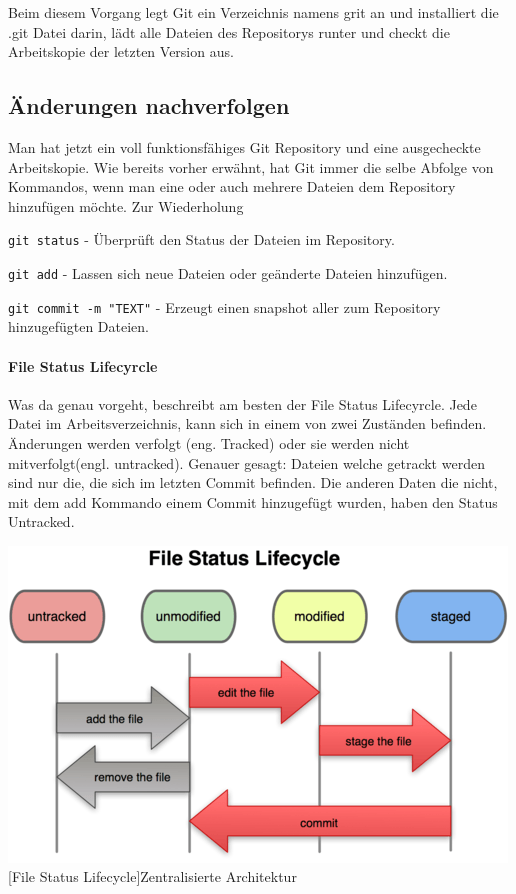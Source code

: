\documentclass[12pt,a4paper,bibliography=totocnumbered,listof=totocnumbered]{scrartcl}
\begin{document}
Beim diesem Vorgang legt Git ein Verzeichnis namens grit an und installiert die .git Datei darin, lädt alle Dateien des Repositorys runter und checkt die Arbeitskopie der letzten Version aus.




\subsection{Änderungen nachverfolgen}
Man hat jetzt ein voll funktionsfähiges Git Repository und eine ausgecheckte Arbeitskopie.  Wie bereits vorher erwähnt, hat Git immer die selbe Abfolge von Kommandos, wenn man eine oder auch mehrere Dateien dem Repository hinzufügen möchte. Zur Wiederholung

\begin{compactitem}
	\item \lstinline|git status| - Überprüft den Status der Dateien im Repository.
	\item \lstinline|git add| - Lassen sich neue Dateien oder geänderte Dateien hinzufügen. 
	\item \lstinline|git commit -m "TEXT"| - Erzeugt einen snapshot aller zum Repository hinzugefügten Dateien.
\end{compactitem}

\paragraph{File Status Lifecyrcle}
Was da genau vorgeht, beschreibt am besten der File Status Lifecyrcle. Jede Datei im Arbeitsverzeichnis, kann sich in einem von zwei Zuständen befinden. Änderungen werden verfolgt (eng. Tracked) oder sie werden nicht mitverfolgt(engl. untracked). 
Genauer gesagt: Dateien welche getrackt werden sind nur die, die sich im letzten Commit befinden. Die anderen Daten die nicht, mit dem add Kommando einem Commit hinzugefügt wurden, haben den Status Untracked. \newline


\newline
\newline
\vspace{1em}
\begin{minipage}{\linewidth}
	\centering
	\includegraphics[width=0.6\linewidth]{Bilder/flc.png}
	[File Status Lifecycle]{Zentralisierte Architektur\footnotemark }
	\label{fig:osgi}
\end{minipage} 	
\end{document}
